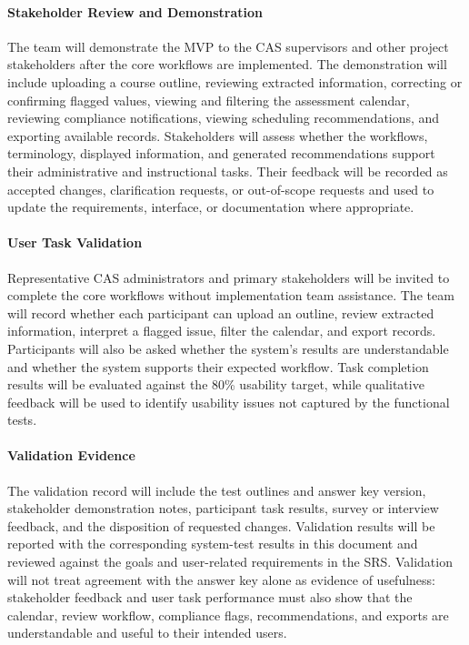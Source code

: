 \documentclass[12pt, titlepage]{article}
\begin{document}
\paragraph{Stakeholder Review and Demonstration}
The team will demonstrate the MVP to the CAS supervisors and other project
stakeholders after the core workflows are implemented. The demonstration will
include uploading a course outline, reviewing extracted information,
correcting or confirming flagged values, viewing and filtering the assessment
calendar, reviewing compliance notifications, viewing scheduling
recommendations, and exporting available records. Stakeholders will assess
whether the workflows, terminology, displayed information, and generated
recommendations support their administrative and instructional tasks. Their
feedback will be recorded as accepted changes, clarification requests, or
out-of-scope requests and used to update the requirements, interface, or
documentation where appropriate.

\paragraph{User Task Validation}
Representative CAS administrators and primary stakeholders will be invited to
complete the core workflows without implementation team assistance. The team
will record whether each participant can upload an outline, review extracted
information, interpret a flagged issue, filter the calendar, and export
records. Participants will also be asked whether the system's results are
understandable and whether the system supports their expected workflow. Task
completion results will be evaluated against the 80\% usability target, while
qualitative feedback will be used to identify usability issues not captured by
the functional tests.

\paragraph{Validation Evidence}
The validation record will include the test outlines and answer key version,
stakeholder demonstration notes, participant task results, survey or interview
feedback, and the disposition of requested changes. Validation results will be
reported with the corresponding system-test results in this document and
reviewed against the goals and user-related requirements in the SRS. Validation
will not treat agreement with the answer key alone as evidence of usefulness:
stakeholder feedback and user task performance must also show that the
calendar, review workflow, compliance flags, recommendations, and exports are
understandable and useful to their intended users.
\end{document}
